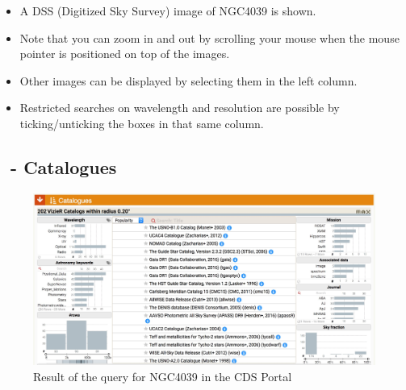 \documentclass [a4paper, 12pt]{article}
\begin{document}
\begin{itemize}
\item A DSS (Digitized Sky Survey) image of NGC4039 is shown.
\item Note that you can zoom in and out by scrolling your mouse when the mouse
pointer is positioned on top of the images.
\item Other images can be displayed by selecting them in the left
column.
\item Restricted searches on wavelength and resolution are possible by
ticking/unticking the boxes in that same column.
\end{itemize}


\subsection{\vizier\ - Catalogues}


\begin{figure}[H]
\center
\includegraphics[width=1
\textwidth]{../images/cdsportal_catalogue-information_ngc4039.jpg}
\caption{Result of the query for NGC4039 in the CDS Portal}
\label{fig:cdsportal4}
\end{figure}
\end{document}
